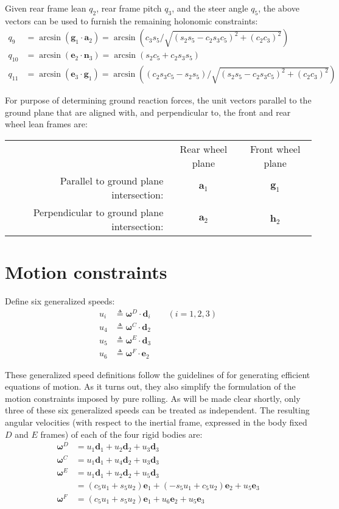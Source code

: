 \documentclass[letterpaper,11pt]{article}
\newcommand{\bs}[1]{ \boldsymbol{ #1 } }
\begin{document}
Given rear frame lean $q_2$, rear frame pitch $q_3$, and the steer angle
$q_5$, the above vectors can be used to furnish the remaining holonomic
constraints:
\begin{align*}
  q_9 & = \arcsin(\bs{g}_1 \cdot \bs{a}_2) = \arcsin\left(c_3 s_5 / \sqrt{(s_2 s_5 -
  c_2 s_3 c_5)^2 + (c_2 c_3)^2}\right) \\
  q_{10} & = \arcsin(\bs{e}_2 \cdot \bs{n}_3) = \arcsin\left(s_2 c_5 + c_2 s_3
  s_5\right)
  \\
  q_{11} & = \arcsin(\bs{e}_3 \cdot \bs{g}_1) = \arcsin \left( (c_2 s_3 c_5 - s_2
    s_5) /\sqrt{(s_2 s_5 - c_2 s_3 c_5)^2 + (c_2 c_3)^2}\right)
\end{align*}

For purpose of determining ground reaction forces, the unit vectors parallel to
the ground plane that are aligned with, and perpendicular to, the front and
rear wheel lean frames are:
\begin{tabular}{rcc}
  & Rear wheel plane & Front wheel plane \\
  Parallel to ground plane intersection: & $\bs{a}_1$ & $\bs{g}_1$\\
  Perpendicular to ground plane intersection: & $\bs{a}_2$ & $\bs{h}_2$
\end{tabular}

\section*{Motion constraints}
\label{sec:motion_constraints}
Define six generalized speeds:
\begin{align*}
  u_i & \triangleq \bs{\omega}^D \cdot \bs{d}_i \qquad (i = 1, 2, 3)\\
  u_4 & \triangleq \bs{\omega}^C \cdot \bs{d}_2\\
  u_5 & \triangleq \bs{\omega}^E \cdot \bs{d}_3\\
  u_6 & \triangleq \bs{\omega}^F \cdot \bs{e}_2
\end{align*}

These generalized speed definitions follow the guidelines of \cite{Mitiguy1996}
for generating efficient equations of motion.  As it turns out, they also
simplify the formulation of the motion constraints imposed by pure rolling.  As
will be made clear shortly, only three of these six generalized speeds can be
treated as independent.  The resulting angular velocities (with respect to the
inertial frame, expressed in the body fixed $D$ and $E$ frames) of each of the
four rigid bodies are:
\begin{align*}
  \bs{\omega}^D & = u_1 \bs{d}_1 + u_2 \bs{d}_2 + u_3 \bs{d}_3 \\
  \bs{\omega}^C & = u_1 \bs{d}_1 + u_4 \bs{d}_2 + u_3 \bs{d}_3 \\
  \bs{\omega}^E & = u_1 \bs{d}_1 + u_2 \bs{d}_2 + u_5 \bs{d}_3 \\
                & = (c_5 u_1 + s_5 u_2)\bs{e}_1 + (-s_5 u_1 + c_5 u_2) \bs{e}_2
                    + u_5 \bs{e}_3 \\
  \bs{\omega}^F & = (c_5 u_1 + s_5 u_2)\bs{e}_1 + u_6 \bs{e}_2
                    + u_5 \bs{e}_3
\end{align*}
\end{document}
